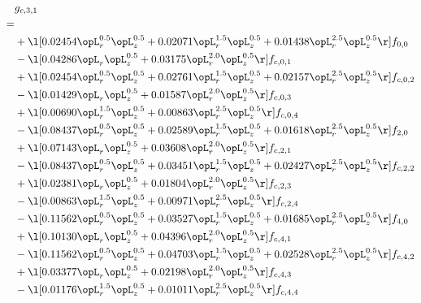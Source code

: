 \begin{alignat}{2} 
\label{eq:g_31_0} 
& g_{c,3,1} \nonumber \\ 
 = \\ 
& + \l[  0.02454 \opL_r^{0.5} \opL_z^{0.5} +  0.02071 \opL_r^{1.5} \opL_z^{0.5} +  0.01438 \opL_r^{2.5} \opL_z^{0.5}  \r] f_{0,0} \nonumber \\ 
& - \l[  0.04286 \opL_r \opL_z^{0.5} +  0.03175 \opL_r^{2.0} \opL_z^{0.5}  \r] f_{c,0,1} \nonumber \\ 
& + \l[  0.02454 \opL_r^{0.5} \opL_z^{0.5} +  0.02761 \opL_r^{1.5} \opL_z^{0.5} +  0.02157 \opL_r^{2.5} \opL_z^{0.5}  \r] f_{c,0,2} \nonumber \\ 
& - \l[  0.01429 \opL_r \opL_z^{0.5} +  0.01587 \opL_r^{2.0} \opL_z^{0.5}  \r] f_{c,0,3} \nonumber \\ 
& + \l[  0.00690 \opL_r^{1.5} \opL_z^{0.5} +  0.00863 \opL_r^{2.5} \opL_z^{0.5}  \r] f_{c,0,4} \nonumber \\ 
& - \l[  0.08437 \opL_r^{0.5} \opL_z^{0.5} +  0.02589 \opL_r^{1.5} \opL_z^{0.5} +  0.01618 \opL_r^{2.5} \opL_z^{0.5}  \r] f_{2,0} \nonumber \\ 
& + \l[  0.07143 \opL_r \opL_z^{0.5} +  0.03608 \opL_r^{2.0} \opL_z^{0.5}  \r] f_{c,2,1} \nonumber \\ 
& - \l[  0.08437 \opL_r^{0.5} \opL_z^{0.5} +  0.03451 \opL_r^{1.5} \opL_z^{0.5} +  0.02427 \opL_r^{2.5} \opL_z^{0.5}  \r] f_{c,2,2} \nonumber \\ 
& + \l[  0.02381 \opL_r \opL_z^{0.5} +  0.01804 \opL_r^{2.0} \opL_z^{0.5}  \r] f_{c,2,3} \nonumber \\ 
& - \l[  0.00863 \opL_r^{1.5} \opL_z^{0.5} +  0.00971 \opL_r^{2.5} \opL_z^{0.5}  \r] f_{c,2,4} \nonumber \\ 
& - \l[  0.11562 \opL_r^{0.5} \opL_z^{0.5} +  0.03527 \opL_r^{1.5} \opL_z^{0.5} +  0.01685 \opL_r^{2.5} \opL_z^{0.5}  \r] f_{4,0} \nonumber \\ 
& + \l[  0.10130 \opL_r \opL_z^{0.5} +  0.04396 \opL_r^{2.0} \opL_z^{0.5}  \r] f_{c,4,1} \nonumber \\ 
& - \l[  0.11562 \opL_r^{0.5} \opL_z^{0.5} +  0.04703 \opL_r^{1.5} \opL_z^{0.5} +  0.02528 \opL_r^{2.5} \opL_z^{0.5}  \r] f_{c,4,2} \nonumber \\ 
& + \l[  0.03377 \opL_r \opL_z^{0.5} +  0.02198 \opL_r^{2.0} \opL_z^{0.5}  \r] f_{c,4,3} \nonumber \\ 
& - \l[  0.01176 \opL_r^{1.5} \opL_z^{0.5} +  0.01011 \opL_r^{2.5} \opL_z^{0.5}  \r] f_{c,4,4} \nonumber \\ 
\end{alignat} 


